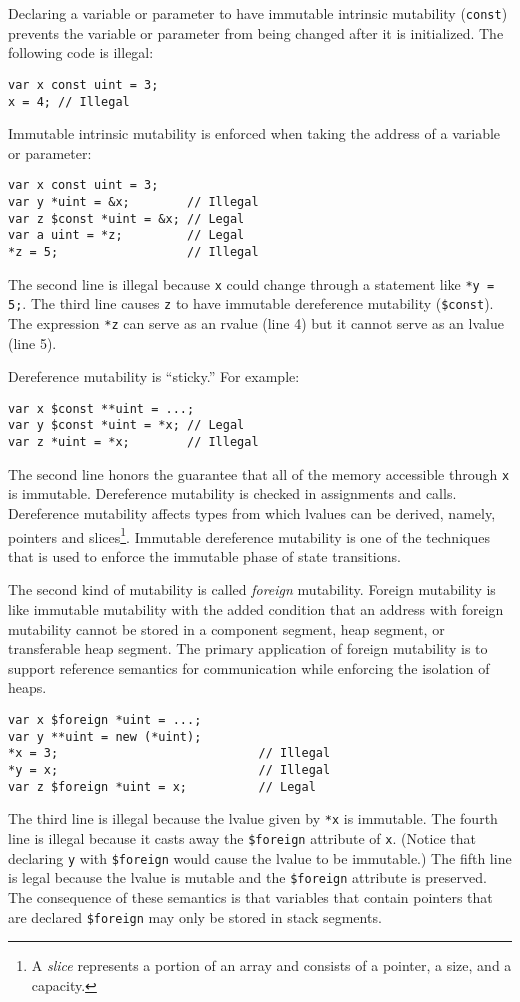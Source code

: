 Declaring a variable or parameter to have immutable intrinsic mutability (\verb+const+) prevents the variable or parameter from being changed after it is initialized.
The following code is illegal:
\begin{verbatim}
var x const uint = 3;
x = 4; // Illegal
\end{verbatim}
Immutable intrinsic mutability is enforced when taking the address of a variable or parameter:
\begin{verbatim}
var x const uint = 3;
var y *uint = &x;        // Illegal
var z $const *uint = &x; // Legal
var a uint = *z;         // Legal
*z = 5;                  // Illegal
\end{verbatim}
The second line is illegal because \verb+x+ could change through a statement like \verb+*y = 5;+.
The third line causes \verb+z+ to have immutable dereference mutability (\verb|$const|).
The expression \verb+*z+ can serve as an rvalue (line 4) but it cannot serve as an lvalue (line 5).

Dereference mutability is ``sticky.''
For example:
\begin{verbatim}
var x $const **uint = ...;
var y $const *uint = *x; // Legal
var z *uint = *x;        // Illegal
\end{verbatim}
The second line honors the guarantee that all of the memory accessible through \verb+x+ is immutable.
Dereference mutability is checked in assignments and calls.
Dereference mutability affects types from which lvalues can be derived, namely, pointers and slices\footnote{A \emph{slice} represents a portion of an array and consists of a pointer, a size, and a capacity.}.
Immutable dereference mutability is one of the techniques that is used to enforce the immutable phase of state transitions.

The second kind of mutability is called \emph{foreign} mutability.
Foreign mutability is like immutable mutability with the added condition that an address with foreign mutability cannot be stored in a component segment, heap segment, or transferable heap segment.
The primary application of foreign mutability is to support reference semantics for communication while enforcing the isolation of heaps.
\begin{verbatim}
var x $foreign *uint = ...;
var y **uint = new (*uint);
*x = 3;                            // Illegal
*y = x;                            // Illegal
var z $foreign *uint = x;          // Legal
\end{verbatim}
The third line is illegal because the lvalue given by \verb+*x+ is immutable.
The fourth line is illegal because it casts away the \verb|$foreign| attribute of \verb+x+.
(Notice that declaring \verb+y+ with \verb|$foreign| would cause the lvalue to be immutable.)
The fifth line is legal because the lvalue is mutable and the \verb|$foreign| attribute is preserved.
The consequence of these semantics is that variables that contain pointers that are declared \verb|$foreign| may only be stored in stack segments.

